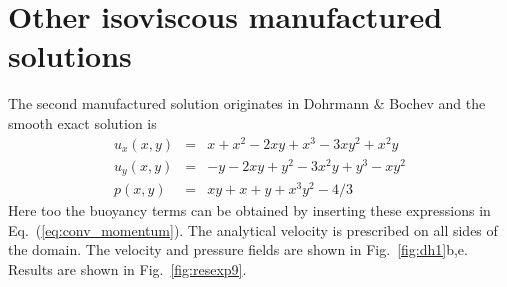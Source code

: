 \documentclass[a4paper,12pt]{article}
\begin{document}
\section{Other isoviscous manufactured solutions}


The second manufactured solution originates in Dohrmann \& Bochev \cite{dobo04} 
and the smooth exact solution is
\begin{eqnarray}
u_x(x,y) &=& x+x^2 - 2xy+x^3 - 3xy^2 + x^2y \\
u_y(x,y) &=& -y-2xy+y^2 -3x^2y + y^3 - xy^2 \\
p(x,y) &=& xy+x+y+x^3y^2 - 4/3
\end{eqnarray}
Here too the buoyancy terms can be obtained by inserting these expressions
in Eq.~(\ref{eq:conv_momentum}).
The analytical velocity is prescribed on all sides of the domain.
The velocity and pressure fields are shown in Fig.~\ref{fig:dh1}b,e.
Results are shown in Fig.~\ref{fig:resexp9}.
\end{document}
